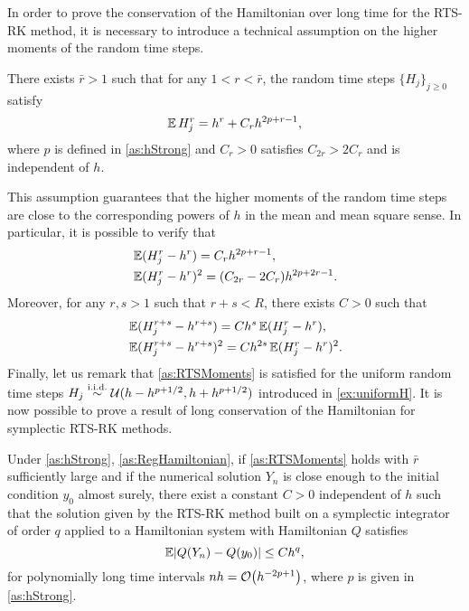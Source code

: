 \documentclass[10pt]{article}
\begin{document}
In order to prove the conservation of the Hamiltonian over long time for the RTS-RK method, it is necessary to introduce a technical assumption on the higher moments of the random time steps.
\begin{assumption}\label{as:RTSMoments} There exists $\bar r > 1$ such that for any $1 < r < \bar r$, the random time steps $\{H_j\}_{j\geq 0}$ satisfy
	\begin{equation}
		\operatorname{\mathbb{E}} H_j^r = h^r + C_rh^{2p+r-1},
	\end{equation}
	where $p$ is defined in \cref{as:hStrong} and $C_r > 0$ satisfies $C_{2r} > 2C_r$ and is independent of $h$.
\end{assumption}
This assumption guarantees that the higher moments of the random time steps are close to the corresponding powers of $h$ in the mean and mean square sense. In particular, it is possible to verify that
\begin{equation}
\begin{aligned}
	&\operatorname{\mathbb{E}}(H_j^r - h^r) = C_r h^{2p+r-1},\\
	&\operatorname{\mathbb{E}}(H_j^r - h^r)^2 = (C_{2r} - 2C_r) h^{2p+2r-1}.
\end{aligned}
\end{equation}
Moreover, for any $r, s > 1$ such that $r + s < R$, there exists $C > 0$ such that
\begin{equation}\label{eq:higherHigherMoments}
\begin{aligned}
	&\operatorname{\mathbb{E}}(H_j^{r+s} - h^{r+s}) = C h^s \operatorname{\mathbb{E}}(H_j^r - h^r),\\
	&\operatorname{\mathbb{E}}(H_j^{r+s} - h^{r+s})^2 = C h^{2s} \operatorname{\mathbb{E}}(H_j^r - h^r)^2.
\end{aligned}
\end{equation}
Finally, let us remark that \cref{as:RTSMoments} is satisfied for the uniform random time steps $H_j \stackrel{\text{i.i.d.}}{\sim} \mathcal U(h-h^{p+1/2}, h+h^{p+1/2})$ introduced in \cref{ex:uniformH}. It is now possible to prove a result of long conservation of the Hamiltonian for symplectic RTS-RK methods.
\begin{theorem}\label{thm:RTSHamiltonian} Under \cref{as:hStrong}, \cref{as:RegHamiltonian}, if \cref{as:RTSMoments} holds with $\bar r$ sufficiently large and if the numerical solution $Y_n$ is close enough to the initial condition $y_0$ almost surely, there exist a constant $C > 0$ independent of $h$ such that the solution given by the RTS-RK method built on a symplectic integrator of order $q$ applied to a Hamiltonian system with Hamiltonian $Q$ satisfies
	\begin{equation}
		\operatorname{\mathbb{E}} \lvert Q(Y_n) - Q(y_0)\rvert \leq C h^q,
	\end{equation}
	for polynomially long time intervals $nh = \mathcal{O}\big(h^{-2p+1}\big)$, where $p$ is given in \cref{as:hStrong}.
\end{theorem}
\end{document}
